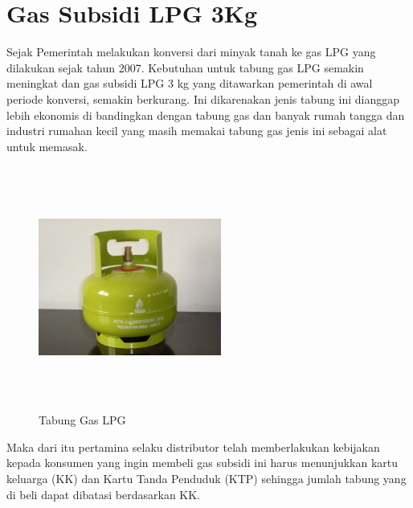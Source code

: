 \section{Gas Subsidi LPG 3Kg}
\par Sejak Pemerintah melakukan konversi dari minyak tanah ke gas LPG yang dilakukan sejak tahun 2007. Kebutuhan untuk tabung gas LPG semakin meningkat dan gas subsidi LPG 3 kg yang ditawarkan pemerintah di awal periode konversi, semakin berkurang. Ini dikarenakan jenis tabung ini dianggap lebih ekonomis di bandingkan dengan tabung gas dan banyak rumah tangga dan industri rumahan kecil yang masih memakai tabung gas jenis ini sebagai alat untuk memasak.
\begin{figure}[H]
	\centering
	\includegraphics [width = 6cm, height= 8cm]{gambar/tabung-gas}
	\caption{Tabung Gas LPG}
	\label{tabung}
\end{figure}

\par Maka dari itu pertamina selaku distributor telah memberlakukan kebijakan kepada konsumen yang ingin membeli gas subsidi ini harus menunjukkan kartu keluarga (KK) dan Kartu Tanda Penduduk (KTP) sehingga jumlah tabung yang di beli dapat dibatasi berdasarkan KK.

